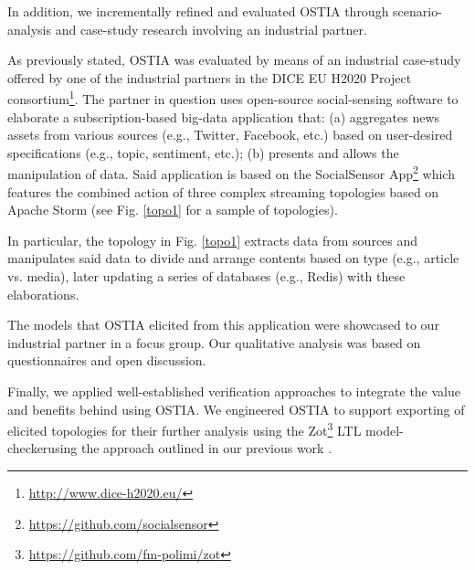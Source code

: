 In addition, we incrementally refined and evaluated OSTIA through scenario-analysis and case-study research \cite{casestudy} involving an industrial partner.

As previously stated, OSTIA was evaluated by means of an industrial case-study offered by one of the industrial partners in the DICE EU H2020 Project consortium\footnote{\url{http://www.dice-h2020.eu/}}. The partner in question uses open-source social-sensing software to elaborate a subscription-based big-data application that: (a) aggregates news assets from various sources (e.g., Twitter, Facebook, etc.) based on user-desired specifications (e.g., topic, sentiment, etc.); (b) presents and allows the manipulation of data. Said application is based on the SocialSensor App\footnote{\url{https://github.com/socialsensor}} which features the combined action of three complex streaming topologies based on Apache Storm (see Fig. \ref{topo1} for a sample of topologies).

In particular, the topology in Fig. \ref{topo1} extracts data from sources and manipulates said data to divide and arrange contents based on type (e.g., article vs. media), later updating a series of databases (e.g., Redis) with these elaborations.

The models that OSTIA elicited from this application were showcased to our industrial partner in a focus group. Our qualitative analysis was based on questionnaires and open discussion.


Finally, we applied well-established verification approaches to integrate the value and benefits behind using OSTIA. We engineered OSTIA to support exporting of elicited topologies for their further analysis using the Zot\footnote{\url{https://github.com/fm-polimi/zot}} LTL model-checkerusing the approach outlined in our previous work \cite{icsoft}.
